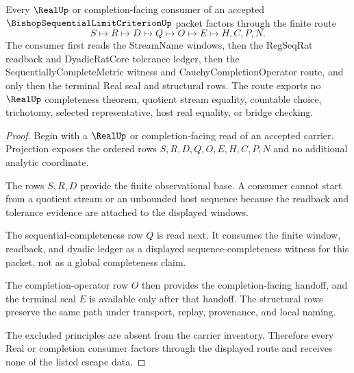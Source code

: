\begin{theorem}
\label{thm:bishop-sequential-limit-criterion-real-completion-route}
Every $\RealUp$ or completion-facing consumer of an accepted $\BishopSequentialLimitCriterionUp$ packet factors through the finite route
$$
S \longmapsto R \longmapsto D \longmapsto Q \longmapsto O \longmapsto E \longmapsto H,C,P,N .
$$
The consumer first reads the StreamName windows, then the RegSeqRat readback and DyadicRatCore tolerance ledger, then the SequentiallyCompleteMetric witness and CauchyCompletionOperator route, and only then the terminal Real seal and structural rows. The route exports no $\RealUp$ completeness theorem, quotient stream equality, countable choice, trichotomy, selected representative, host real equality, or bridge checking.
\end{theorem}
\begin{proof}
Begin with a $\RealUp$ or completion-facing read of an accepted carrier. Projection exposes the ordered rows $S,R,D,Q,O,E,H,C,P,N$ and no additional analytic coordinate.

The rows $S,R,D$ provide the finite observational base. A consumer cannot start from a quotient stream or an unbounded host sequence because the readback and tolerance evidence are attached to the displayed windows.

The sequential-completeness row $Q$ is read next. It consumes the finite window, readback, and dyadic ledger as a displayed sequence-completeness witness for this packet, not as a global completeness claim.

The completion-operator row $O$ then provides the completion-facing handoff, and the terminal seal $E$ is available only after that handoff. The structural rows preserve the same path under transport, replay, provenance, and local naming.

The excluded principles are absent from the carrier inventory. Therefore every Real or completion consumer factors through the displayed route and receives none of the listed escape data.
\end{proof}


